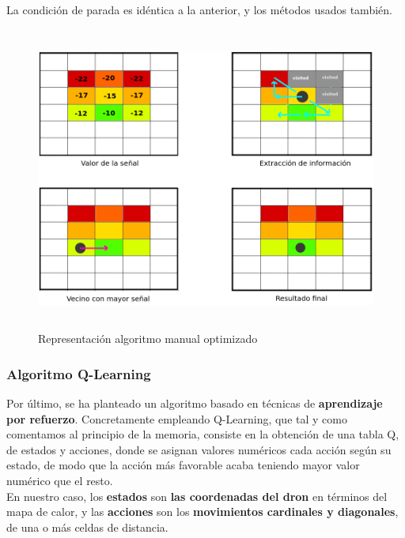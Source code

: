 La condición de parada es idéntica a la anterior, y los métodos usados también.\\

\begin{figure} [H]
    \begin{center}
    \includegraphics[height=10cm]{imagenes/cap4/10_algoritmo_optimizado.png}
    \end{center}
    \caption[Representación algoritmo manual optimizado]{Representación algoritmo manual optimizado}
    \label{fig:opt_algorithm}
\end{figure}

\subsubsection{Algoritmo Q-Learning}
\label{subsec:alg-q}

Por último, se ha planteado un algoritmo basado en técnicas de \textbf{aprendizaje por refuerzo}. Concretamente empleando Q-Learning, que tal y como comentamos al principio de la memoria, consiste en la obtención de una tabla Q, de estados y acciones, donde se asignan valores numéricos cada acción según su estado, de modo que la acción más favorable acaba teniendo mayor valor numérico que el resto.\\

En nuestro caso, los \textbf{estados} son \textbf{las coordenadas del dron} en términos del mapa de calor, y las \textbf{acciones} son los \textbf{movimientos cardinales y diagonales}, de una o más celdas de distancia.\\

